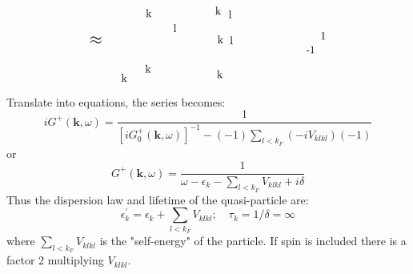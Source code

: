 \begin{equation}
\begin{tikzpicture}[x=0.55pt,y=0.55pt,yscale=-1,xscale=1]
\draw (104,124) node [anchor=north west][inner sep=0.75pt]   [align=left] {k};
\draw (143,109.13) node [anchor=north west][inner sep=0.75pt]   [align=left] {k};
\draw (144,19.13) node [anchor=north west][inner sep=0.75pt]   [align=left] {k};
\draw (189,43.13) node [anchor=north west][inner sep=0.75pt]   [align=left] {l};
\draw (279,21.13) node [anchor=north west][inner sep=0.75pt]   [align=left] {l};
\draw (281,63.13) node [anchor=north west][inner sep=0.75pt]   [align=left] {l};
\draw (259.81,117.71) node [anchor=north west][inner sep=0.75pt]   [align=left] {k};
\draw (260.81,61.71) node [anchor=north west][inner sep=0.75pt]   [align=left] {k};
\draw (257.14,14.82) node [anchor=north west][inner sep=0.75pt]   [align=left] {k};
\draw (52.62,63.17) node [anchor=north west][inner sep=0.75pt]  [font=\Large]  {$\approx $};
\draw (428.62,56.73) node [anchor=north west][inner sep=0.75pt]    {$1$};
\draw (405.62,79.73) node [anchor=north west][inner sep=0.75pt]  [font=\small] [align=left] {\mbox{-}1};


\end{tikzpicture}
\label{Hartree-bubble-approx}
\end{equation}
Translate into equations, the series becomes:
\begin{equation}i G^{+}(\mathbf{k}, \omega)=\frac{1}{\left[i G_{0}^{+}(\mathbf{k}, \omega)\right]^{-1}-(-1) \sum_{l<k_{F}}\left(-i V_{klkl}\right)(-1)}\end{equation}
or
\begin{equation}G^{+}(\mathbf{k}, \omega)=\frac{1}{\omega-\epsilon_{k}-\sum_{l<k_{F}} V_{k l k l}+i \delta}\end{equation}
Thus the dispersion law and lifetime of the quasi-particle are:
\begin{equation}\epsilon_{k}^{\prime}=\epsilon_{k}+\sum_{l<k_{F}} V_{k l k l} ; \quad \tau_{k}=1 / \delta=\infty\end{equation}
where $\sum_{l<k_{F}} V_{k l k l}$ is the "self-energy" of the particle. If spin is included there is a factor 2 multiplying $V_{klkl}$.

